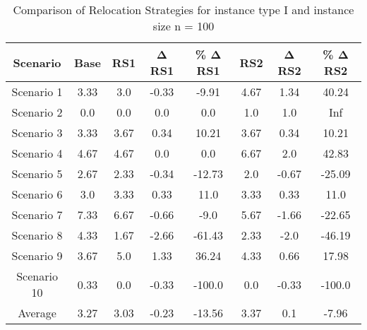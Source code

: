 \begin{table}[H]
\centering
\begin{tabular}{cccccccc}
  \hline
  \textbf{Scenario} & \textbf{Base} & \textbf{RS1} & \textbf{Δ RS1} & \textbf{\% Δ RS1} & \textbf{RS2} & \textbf{Δ RS2} & \textbf{\% Δ RS2} \\\hline
  Scenario 1 & 3.33 & 3.0 & -0.33 & -9.91 & 4.67 & 1.34 & 40.24 \\
  Scenario 2 & 0.0 & 0.0 & 0.0 & 0.0 & 1.0 & 1.0 & Inf \\
  Scenario 3 & 3.33 & 3.67 & 0.34 & 10.21 & 3.67 & 0.34 & 10.21 \\
  Scenario 4 & 4.67 & 4.67 & 0.0 & 0.0 & 6.67 & 2.0 & 42.83 \\
  Scenario 5 & 2.67 & 2.33 & -0.34 & -12.73 & 2.0 & -0.67 & -25.09 \\
  Scenario 6 & 3.0 & 3.33 & 0.33 & 11.0 & 3.33 & 0.33 & 11.0 \\
  Scenario 7 & 7.33 & 6.67 & -0.66 & -9.0 & 5.67 & -1.66 & -22.65 \\
  Scenario 8 & 4.33 & 1.67 & -2.66 & -61.43 & 2.33 & -2.0 & -46.19 \\
  Scenario 9 & 3.67 & 5.0 & 1.33 & 36.24 & 4.33 & 0.66 & 17.98 \\
  Scenario 10 & 0.33 & 0.0 & -0.33 & -100.0 & 0.0 & -0.33 & -100.0 \\
  Average & 3.27 & 3.03 & -0.23 & -13.56 & 3.37 & 0.1 & -7.96 \\\hline
\end{tabular}
\caption{Comparison of Relocation Strategies for instance type I and instance size n = 100}
\label{tab:wait:resrelocation-comparison_I_100}
\end{table}
